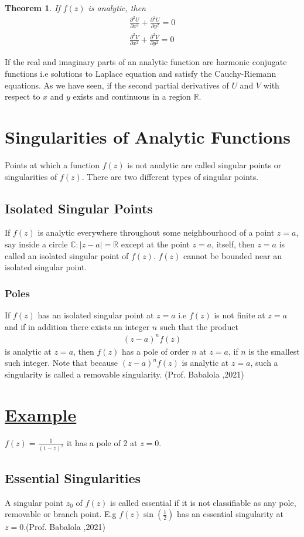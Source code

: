 \documentclass[11pt]{report}
\newcommand{\ubt}[1]{\textbf{\underline{#1}}}
\newcommand{\sps}{\\[0.2cm]}
\newcommand{\dsp}{\displaystyle}
\newcommand{\real}{ \mathbb{R}}
\newcommand{\complex}{\mathbb{C}}
\newcommand{\example}[1]{\section*{\ubt{Example #1}}}
\newtheorem{theorem}{Theorem}[chapter]
\begin{document}
	\begin{theorem}
		If $f(z)$ is analytic, then
		\begin{eqnarray}
			\frac{\partial^2 U}{\partial x^2} + \frac{\partial^2 U}{\partial y^2} = 0\label{eq:2_13}\sps
			\frac{\partial^2 V}{\partial x^2} + \frac{\partial^2 V}{\partial y^2} = 0\label{eq:2_14}
		\end{eqnarray}
	\end{theorem}
	If the real and imaginary parts of an analytic function are harmonic conjugate functions i.e solutions to Laplace equation and satisfy the Cauchy-Riemann equations. As we have seen, if the second partial derivatives of $U$ and $V$ with respect to $x$ and $y$ exists and continuous in a region $\real$.
	
	\section{Singularities of Analytic Functions}
	Points at which a function $f(z)$ is not analytic are called singular points or singularities of $f(z)$. There are two different types of singular points.
	
	\subsection{Isolated Singular Points}
	If $f(z)$ is analytic everywhere throughout some neighbourhood of a point $z=a$, say inside a circle $\complex:|z-a|=\real$ except at the point $z=a$, itself, then $z=a$ is called an isolated singular point of $f(z)$. $f(z)$ cannot be bounded near an isolated singular point.
	
	\subsubsection{Poles}
	If $f(z)$ has an isolated singular point at $z=a$ i.e $f(z)$ is not finite at $z=a$ and if in addition there exists an integer $n$ such that the product
	\begin{eqnarray}
		(z-a)^n f(z)
	\end{eqnarray}
	is analytic at $z=a$, then $f(z)$ has a pole of order $n$ at $z=a$, if $n$ is the smallest such integer. Note that because $(z-a)^nf(z)$ is analytic at $z=a$, such a singularity is called a removable singularity.  (Prof. Babalola ,2021)
	\example{}
	$\dsp f(z)= \frac{1}{(1-z)^2}$ it has a pole of 2 at $z=0$.
	
	\subsection{Essential Singularities}
	A singular point $z_0$ of $f(z)$ is called essential if it is not classifiable as any pole, removable or branch point. E.g $f(z)\sin\left(\frac{1}{2}\right)$ has an essential singularity at $z=0$.(Prof. Babalola ,2021)
	
\end{document}
